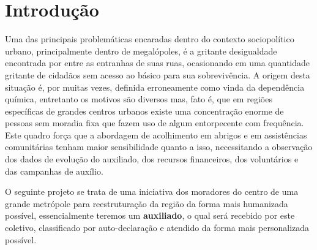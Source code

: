 \section{Introdução}
\label{sec:introducao}
Uma das principais problemáticas encaradas dentro do contexto sociopolítico urbano, principalmente dentro de megalópoles, é a gritante desigualdade encontrada por entre as entranhas de suas ruas, ocasionando em uma quantidade gritante de cidadãos sem acesso ao básico para sua sobrevivência. A origem desta situação é, por muitas vezes, definida erroneamente como vinda da dependência química, entretanto os motivos são diversos mas, fato é, que em regiões específicas de grandes centros urbanos existe uma concentração enorme de pessoas sem moradia fixa que fazem uso de algum entorpecente com frequência. Este quadro força que a abordagem de acolhimento em abrigos e em assistências comunitárias tenham maior sensibilidade quanto a isso, necessitando a observação dos dados de evolução do auxiliado, dos recursos financeiros, dos voluntários e das campanhas de auxílio.

O seguinte projeto se trata de uma iniciativa dos moradores do centro de uma grande metrópole para reestruturação da região da forma mais humanizada possível, essencialmente teremos um \textbf{auxiliado}, o qual será recebido por este coletivo, classificado por auto-declaração e atendido da forma mais personalizada possível.

